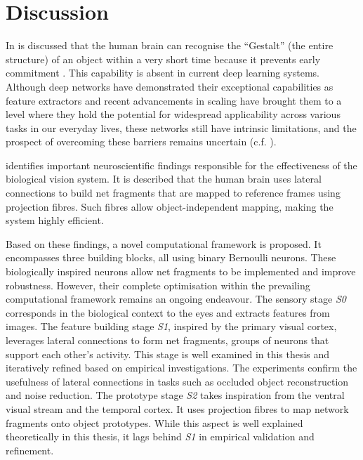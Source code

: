 \section{Discussion}
In  is discussed that the human brain can recognise the ``Gestalt'' (the entire structure) of an object within a very short time  because it prevents early commitment .
This capability is absent in current deep learning systems.
Although deep networks have demonstrated their exceptional capabilities as feature extractors and recent advancements in scaling have brought them to a level where they hold the potential for widespread applicability across various tasks in our everyday lives, these networks still have intrinsic limitations, and the prospect of overcoming these barriers remains uncertain (c.f. ).

 identifies important neuroscientific findings responsible for the effectiveness of the biological vision system.
It is described that the human brain uses lateral connections to build net fragments that are mapped to reference frames using projection fibres.
Such fibres allow object-independent mapping, making the system highly efficient.

Based on these findings, a novel computational framework is proposed.
It encompasses three building blocks, all using binary Bernoulli neurons.
These biologically inspired neurons allow net fragments to be implemented and improve robustness. However, their complete optimisation within the prevailing computational framework remains an ongoing endeavour.
The sensory stage \emph{S0} corresponds in the biological context to the eyes and extracts features from images.
The feature building stage \emph{S1}, inspired by the primary visual cortex, leverages lateral connections to form net fragments, groups of neurons that support each other's activity.
This stage is well examined in this thesis and iteratively refined based on empirical investigations.
The experiments confirm the usefulness of lateral connections in tasks such as occluded object reconstruction and noise reduction.
The prototype stage \emph{S2} takes inspiration from the ventral visual stream and the temporal cortex.
It uses projection fibres to map network fragments onto object prototypes. While this aspect is well explained theoretically in this thesis, it lags behind \emph{S1} in empirical validation and refinement.

